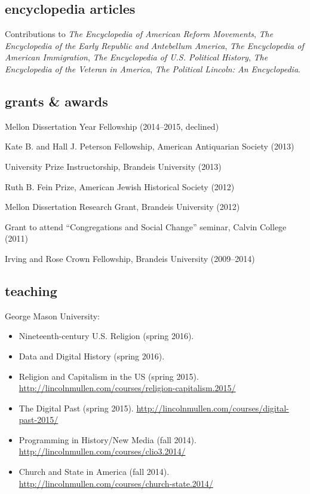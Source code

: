 \documentclass[11pt]{article}
\providecommand{\tightlist}{%
  \setlength{\itemsep}{0pt}\setlength{\parskip}{0pt}}
\begin{document}
\subsection{encyclopedia articles}\label{encyclopedia-articles}

Contributions to \emph{The Encyclopedia of American Reform Movements},
  \emph{The Encyclopedia of the Early Republic and Antebellum America},
  \emph{The Encyclopedia of American Immigration},
  \emph{The Encyclopedia of U.S. Political History},
  \emph{The Encyclopedia of the Veteran in America},
  \emph{The Political Lincoln: An Encyclopedia}.

\subsection{grants \& awards}\label{grants-awards}

Mellon Dissertation Year Fellowship (2014--2015, declined)

Kate B. and Hall J. Peterson Fellowship, American Antiquarian Society
(2013)

University Prize Instructorship, Brandeis University (2013)

Ruth B. Fein Prize, American Jewish Historical Society (2012)

Mellon Dissertation Research Grant, Brandeis University (2012)

Grant to attend ``Congregations and Social Change'' seminar, Calvin
College (2011)

Irving and Rose Crown Fellowship, Brandeis University (2009--2014)

\subsection{teaching}\label{teaching}

George Mason University:

\begin{itemize}
\tightlist
\item Nineteenth-century U.S. Religion (spring 2016).
\item Data and Digital History (spring 2016).
\item Religion and Capitalism in the US (spring 2015). 
  \url{http://lincolnmullen.com/courses/religion-capitalism.2015/}
\item The Digital Past (spring 2015). 
  \url{http://lincolnmullen.com/courses/digital-past-2015/}
\item
  Programming in History/New Media (fall 2014).  
  \url{http://lincolnmullen.com/courses/clio3.2014/}
\item
  Church and State in America (fall 2014). 
  \url{http://lincolnmullen.com/courses/church-state.2014/}
\end{itemize}
\end{document}
